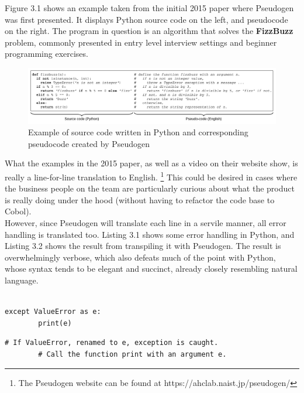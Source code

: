 Figure 3.1 shows an example taken from the initial 2015 paper where Pseudogen was first presented. It displays Python source code on the left, and pseudocode on the right. The program in question is an algorithm that solves the \textbf{FizzBuzz} problem, commonly presented in entry level interview settings and beginner programming exercises. \hfill \\

\begin{figure}[ht]
    \centering
    \includegraphics[scale=0.52]{assets/odaetal.png}
    \caption{Example of source code written in Python and corresponding pseudocode created by Pseudogen}
    \label{fig:odaetal}
\end{figure}

What the examples in the 2015 paper, as well as a video on their website show, is really a line-for-line translation to English. \footnote{The Pseudogen website can be found at https://ahclab.naist.jp/pseudogen/} This could be desired in cases where the business people on the team are particularly curious about what the product is really doing under the hood (without having to refactor the code base to Cobol). \\

However, since Pseudogen will translate each line in a servile manner, all error handling is translated too. Listing 3.1 shows some error handling in Python, and Listing 3.2 shows the result from transpiling it with Pseudogen. The result is overwhelmingly verbose, which also defeats much of the point with Python, whose syntax tends to be elegant and succinct, already closely resembling natural language. \\ \\


\begin{lstlisting}[caption={Error handling in Python}, captionpos=b, frame=trbl]
    except ValueError as e:
        print(e)
\end{lstlisting}

\begin{lstlisting}[caption={The result of transpiling the code in Listing ?? with Pseudogen}, captionpos=b, frame=trbl]
    # If ValueError, renamed to e, exception is caught.
        # Call the function print with an argument e.
\end{lstlisting}

